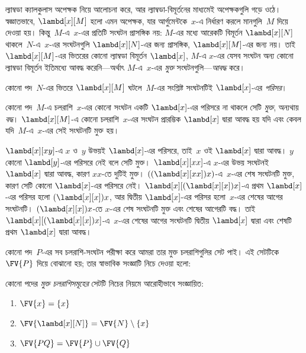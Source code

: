 \documentclass[../../../include/open-logic-section]{subfiles}
\begin{document}

ল্যাম্বডা ক্যালকুলাস অপেক্ষক নিয়ে আলোচনা করে, আর ল্যাম্বডা-বিমূর্তনের
মাধ্যমেই অপেক্ষকগুলি গড়ে ওঠে। স্বজ্ঞাতভাবে, $\lambd[x][M]$ হলো এমন
অপেক্ষক, যার আর্গুমেন্টকে~$x$-এ নির্ধারণ করলে মানগুলি~$M$ দিয়ে দেওয়া
হয়। কিন্তু~$M$-এ~$x$-এর প্রতিটি সংঘটন প্রাসঙ্গিক নয়: $M$-এর মধ্যে
আরেকটি বিমূর্তন $\lambd[x][N]$ থাকলে~$N$-এ~$x$-এর সংঘটনগুলি
$\lambd[x][N]$-এর জন্য প্রাসঙ্গিক, $\lambd[x][M]$-এর জন্য নয়। তাই
$\lambd[x][M]$-এর ভিতরের কোনো ল্যাম্বডা বিমূর্তন $\lambd[x]$, $M$-এ
$x$-এর যেসব সংঘটন অন্য কোনো ল্যাম্বডা বিমূর্তন ইতিমধ্যে আবদ্ধ করেনি—অর্থাৎ
$M$-এ~$x$-এর \emph{মুক্ত} সংঘটনগুলি—\emph{আবদ্ধ} করে।

\begin{defn}[পরিসর]
কোনো পদ~$N$-এর ভিতরে $\lambd[x][M]$ ঘটলে~$M$-এর সংশ্লিষ্ট সংঘটনটিই
$\lambd[x]$-এর \emph{পরিসর}।
\end{defn}


\begin{defn}[মুক্ত ও বদ্ধ সংঘটন]
  কোনো পদ~$M$-এ চলরাশি~$x$-এর কোনো সংঘটন একটি $\lambd[x]$-এর পরিসরে
  না থাকলে সেটি \emph{মুক্ত}, অন্যথায় \emph{বদ্ধ}। $\lambd[x][M]$-এ
  কোনো চলরাশি~$x$-এর সংঘটন প্রারম্ভিক $\lambd[x]$ দ্বারা আবদ্ধ হয় যদি
  এবং কেবল যদি~$M$-এ~$x$-এর সেই সংঘটনটি মুক্ত হয়।
\end{defn}

\begin{ex}
  $\lambd[x][x y]$-এ $x$ ও~$y$ উভয়ই $\lambd[x]$-এর পরিসরে, তাই~$x$
  ওই $\lambd[x]$ দ্বারা আবদ্ধ। $y$ কোনো $\lambd[y]$-এর পরিসরে নেই বলে
  সেটি মুক্ত। $\lambd[x][x x]$-এ $x$-এর উভয় সংঘটনই $\lambd[x]$ দ্বারা
  আবদ্ধ, কারণ $xx$-তে দুটিই মুক্ত। $((\lambd[x][xx])x)$-এ~$x$-এর শেষ
  সংঘটনটি মুক্ত, কারণ সেটি কোনো $\lambd[x]$-এর পরিসরে নেই।
  $\lambd[x][(\lambd[x][x])x]$-এ প্রথম $\lambd[x]$-এর পরিসর হলো
  $(\lambd[x][x])x$, আর দ্বিতীয় $\lambd[x]$-এর পরিসর হলো~$x$-এর শেষের
  আগের সংঘটনটি। $(\lambd[x][x])x$-তে $x$-এর শেষ সংঘটনটি মুক্ত এবং শেষের
  আগেরটি বদ্ধ। তাই $\lambd[x][(\lambd[x][x])x]$-এ~$x$-এর শেষের আগের
  সংঘটনটি দ্বিতীয় $\lambd[x]$ দ্বারা এবং শেষটি প্রথম $\lambd[x]$ দ্বারা
  আবদ্ধ।
\end{ex}

কোনো পদ~$P$-এর সব চলরাশি-সংঘটন পরীক্ষা করে আমরা তার মুক্ত চলরাশিগুলির
সেট পাই। এই সেটটিকে $\FV{P}$ দিয়ে বোঝানো হয়; তার স্বাভাবিক সংজ্ঞাটি
নিচে দেওয়া হলো:

\begin{defn}[কোনো পদের মুক্ত চলরাশি] 
  কোনো পদের \emph{মুক্ত চলরাশিসমূহের} সেটটি নিচের নিয়মে আরোহীভাবে সংজ্ঞায়িত:
  \begin{enumerate}
    \item $\FV{x} = \{x\}$ 
    \item $\FV{\lambd[x][N]} = \FV{N} \setminus \{x\}$    
    \item $\FV{PQ} = \FV{P} \cup \FV{Q}$ 
  \end{enumerate}
\end{defn}
\end{document}
